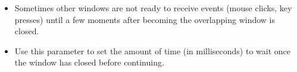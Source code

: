 \begin{itemize}
\item Sometimes other windows are not ready to receive events (mouse clicks, key presses) until a few moments after becoming the overlapping window is closed.
\item Use this parameter to set the amount of time (in milliseconds) to wait once the window has closed before continuing.
\end{itemize}

